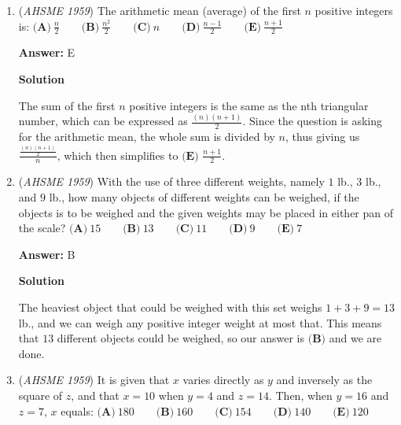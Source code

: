 \begin{enumerate}
 Plugging that in to the original system of equations:
 \[\begin {cases} 1 = a - 5 \\ 5 = a - \frac{5}{5} \end {cases}\]It is easy to see that $a = 6$, and that $a+b$ is $\boxed{\textbf{(E) } 11}$.

 


	\item (\textit{AHSME 1959}) The arithmetic mean (average) of the first $n$ positive integers is:
$\textbf{(A)}\ \frac{n}{2} \qquad\textbf{(B)}\ \frac{n^2}{2}\qquad\textbf{(C)}\ n\qquad\textbf{(D)}\ \frac{n-1}{2}\qquad\textbf{(E)}\ \frac{n+1}{2}$

 \textbf{Answer: }E



\textbf{Solution}

The sum of the first $n$ positive integers is the same as the nth triangular number, which can be expressed as $\frac{(n)(n+1)}{2}$. Since the question is asking for the arithmetic mean, the whole sum is divided by $n$, thus giving us $\frac {\frac{(n)(n+1)}{2}}{n}$, which then simplifies to $\boxed{\textbf{(E) } \frac{n+1}{2}}$.

 


	\item (\textit{AHSME 1959}) With the use of three different weights, namely $1$ lb., $3$ lb., and $9$ lb., how many objects of different weights can be weighed, 
if the objects is to be weighed and the given weights may be placed in either pan of the scale?
$\textbf{(A)}\ 15 \qquad\textbf{(B)}\ 13\qquad\textbf{(C)}\ 11\qquad\textbf{(D)}\ 9\qquad\textbf{(E)}\ 7$

 \textbf{Answer: }B



\textbf{Solution}

The heaviest object that could be weighed with this set weighs $1 + 3 + 9 = 13$ lb., and we can weigh any positive integer weight at most that. This means that $13$ different objects could be weighed, so our answer is $\boxed{\textbf{(B)}}$ and we are done.

 


	\item (\textit{AHSME 1959}) It is given that $x$ varies directly as $y$ and inversely as the square of $z$, and that $x=10$ when $y=4$ and $z=14$. Then, when $y=16$ and $z=7$, $x$ equals:
$\textbf{(A)}\ 180\qquad \textbf{(B)}\ 160\qquad \textbf{(C)}\ 154\qquad \textbf{(D)}\ 140\qquad \textbf{(E)}\ 120$


\end{enumerate}
